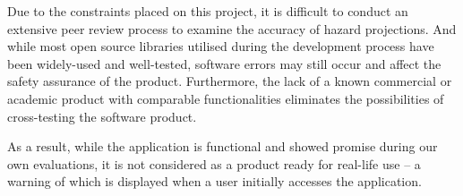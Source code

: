 \documentclass[openany]{UoYCSproject}
\begin{document}
Due to the constraints placed on this project, it is difficult to conduct an extensive peer review process to examine the accuracy of hazard projections. And while most open source libraries utilised during the development process have been widely-used and well-tested, software errors may still occur and affect the safety assurance of the product. Furthermore, the lack of a known commercial or academic product with comparable functionalities eliminates the possibilities of cross-testing the software product.

As a result, while the application is functional and showed promise during our own evaluations, it is not considered as a product ready for real-life use -- a warning of which is displayed when a user initially accesses the application.

\small{}
\end{document}
